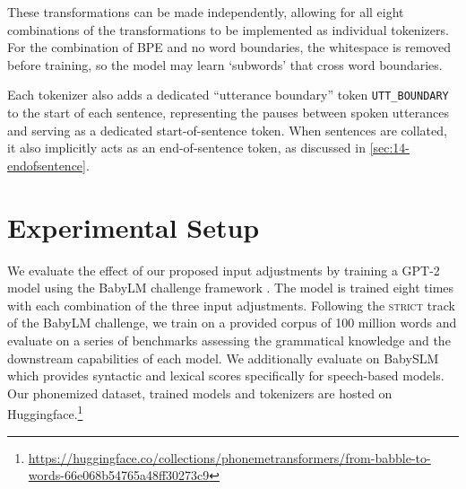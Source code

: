 


These transformations can be made independently, allowing for all eight combinations of the transformations to be implemented as individual tokenizers. For the combination of BPE and no word boundaries, the whitespace is removed before training, so the model may learn `subwords' that cross word boundaries.

Each tokenizer also adds a dedicated ``utterance boundary'' token \texttt{UTT\_BOUNDARY} to the start of each sentence, representing the pauses between spoken utterances and serving as a dedicated start-of-sentence token. When sentences are collated, it also implicitly acts as an end-of-sentence token, as discussed in \cref{sec:14-endofsentence}.

\section{Experimental Setup}

We evaluate the effect of our proposed input adjustments by training a GPT-2 model \citep{radford-2019-gpt2} using the BabyLM challenge framework \citep{choshen-et-al-2024-callforpapers-babylm2}. The model is trained eight times with each combination of the three input adjustments. Following the \textsc{strict} track of the BabyLM challenge, we train on a provided corpus of 100 million words and evaluate on a series of benchmarks assessing the grammatical knowledge and the downstream capabilities of each model. We additionally evaluate on BabySLM \citep{lavechin} which provides syntactic and lexical scores specifically for speech-based models. Our phonemized dataset, trained models and tokenizers are hosted on Huggingface.\footnote{\url{https://huggingface.co/collections/phonemetransformers/from-babble-to-words-66e068b54765a48ff30273c9}}

